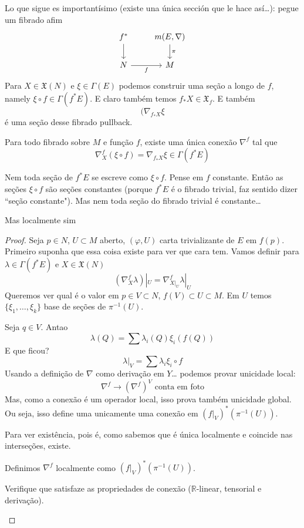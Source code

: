 Lo que sigue es importantísimo (existe una única sección que le hace así…): pegue um fibrado afim
\[\begin{tikzcd}
f^*\arrow[d]&m(E,\nabla)\arrow[d,"\pi"]\\
N\arrow[r,"f",swap]&M
\end{tikzcd}\]
Para \(X \in \mathfrak{X}(N)\) e \(\xi \in \Gamma(E)\) podemos construir uma seção a longo de \(f\), namely \(\xi \circ f \in \Gamma(f^* E)\). E claro também temos \(f_*X \in \mathfrak{X}_f\). E também
\[(\nabla_{f_*X}\xi\]
é uma seção desse fibrado pullback.

\begin{prop}\leavevmode
Para todo fibrado sobre \(M\) e função \(f\), existe uma única conexão \(\nabla^f\) tal que
\[\nabla_X^f(\xi \circ f)=\nabla_{f_*X}\xi \in \Gamma(f^*E)\]

\end{prop}
\begin{remark}\leavevmode
Nem toda seção de \(f^*E\) se escreve como \(\xi \circ f\). Pense em \(f\) constante. Então as seções \(\xi \circ f\) são seções constantes (porque \(f^*E\) é o fibrado trivial, faz sentido dizer ``seção constante"). Mas nem toda seção do fibrado trivial é constante…

Mas localmente sim
\end{remark}

\begin{proof}\leavevmode
Seja \(p \in N\), \(U \subset M\) aberto, \((\varphi,U)\) carta trivializante de \(E\) em \(f(p)\). Primeiro suponha que essa coisa existe para ver que cara tem. Vamos definir para \(\lambda \in \Gamma(f^*E)\) e \(X \in \mathfrak{X}(N)\)
\[(\nabla_X^f \lambda)|_{U}=\nabla_{X|_{U}}^f \lambda|_{U}\]
Queremos ver qual é o valor em \(p \in V \subset N\), \(f(V) \subset U \subset M\). Em \(U\) temos \(\{\xi_1,\ldots,\xi_k\}\) base de seções de \(\pi^{-1}(U)\).

Seja \(q \in V\). Antao
\[\lambda(Q)=\sum\lambda_i(Q) \xi_i(f(Q))\]
E que ficou?
\[\lambda|_{V}=\sum\lambda_i \xi_i \circ f\]
Usando a definição de \(\nabla\) como derivação em \(Y\)… podemos provar unicidade local:
\[\nabla^f \longrightarrow (\nabla^f)^V\text{ conta em foto} \]
Mas, como a conexão é um operador local, isso prova também unicidade global. Ou seja, isso define uma unicamente uma conexão em \((f|_{V})^*(\pi^{-1}(U))\).

Para ver existência, pois é, como sabemos que é única localmente e coincide nas interseções, existe.

Definimos \(\nabla^f\) localmente como \((f|_{V})^*(\pi^{-1}(U))\).

\begin{exercise}\leavevmode
Verifique que satisfaze as propriedades de conexão (\(\mathbb{R}\)-linear, tensorial e derivação).
\end{exercise}
\end{proof}

